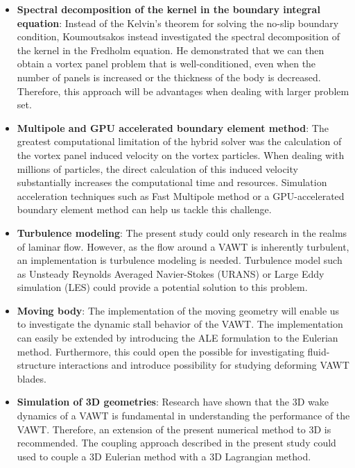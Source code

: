 \begin{itemize}
\item \textbf{Spectral decomposition of the kernel in the boundary integral equation}: Instead of the Kelvin's theorem for solving the no-slip boundary condition, Koumoutsakos \cite{Koumoutsakos1993a} instead investigated the spectral decomposition of the kernel in the Fredholm equation. He demonstrated that we can then obtain a vortex panel problem that is well-conditioned, even when the number of panels is increased or the thickness of the body is decreased. Therefore, this approach will be advantages when dealing with larger problem set.

\item \textbf{Multipole and GPU accelerated boundary element method}: The greatest computational limitation of the hybrid solver was the calculation of the vortex panel induced velocity on the vortex particles. When dealing with millions of particles, the direct calculation of this induced velocity substantially increases the computational time and resources. Simulation acceleration techniques such as Fast Multipole method or a GPU-accelerated boundary element method can help us tackle this challenge.

\item \textbf{Turbulence modeling}: The present study could only research in the realms of laminar flow. However, as the flow around a VAWT is inherently turbulent, an implementation is turbulence modeling is needed. Turbulence model such as Unsteady Reynolds Averaged Navier-Stokes (URANS) or Large Eddy simulation (LES) could provide a potential solution to this problem.

\item \textbf{Moving body}: The implementation of the moving geometry will enable us to investigate the dynamic stall behavior of the VAWT. The implementation can easily be extended by introducing the ALE formulation to the Eulerian method. Furthermore, this could open the possible for investigating fluid-structure interactions and introduce possibility for studying deforming VAWT blades.

\item \textbf{Simulation of 3D geometries}: Research have shown that the 3D wake dynamics of a VAWT is fundamental in understanding the performance of the VAWT. Therefore, an extension of the present numerical method to 3D is recommended. The coupling approach described in the present study could used to couple a 3D Eulerian method with a 3D Lagrangian method.


\end{itemize}

